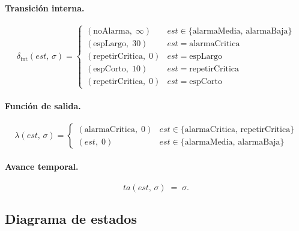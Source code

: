 \documentclass{article}
\newcommand{\dint}{\delta_{\mathrm{int}}}
\newcommand{\ta}{\mathit{ta}}
\begin{document}
\paragraph{Transición interna.}
\[
\dint(\mathit{est},\,\sigma) =
\begin{cases}
  (\mathrm{noAlarma},\;\infty)       & \mathit{est}\in\{\mathrm{alarmaMedia},\,\mathrm{alarmaBaja}\} \\[4pt]
  (\mathrm{espLargo},\;30)           & \mathit{est} = \mathrm{alarmaCritica} \\[4pt]
  (\mathrm{repetirCritica},\;0)      & \mathit{est} = \mathrm{espLargo} \\[4pt]
  (\mathrm{espCorto},\;10)           & \mathit{est} = \mathrm{repetirCritica} \\[4pt]
  (\mathrm{repetirCritica},\;0)      & \mathit{est} = \mathrm{espCorto}
\end{cases}
\]

\paragraph{Función de salida.}
\[
\lambda(\mathit{est},\,\sigma) =
\begin{cases}
  (\mathrm{alarmaCritica},\;0)
    & \mathit{est}\in\{\mathrm{alarmaCritica},\,\mathrm{repetirCritica}\} \\[4pt]
  (\mathit{est},\;0)
    & \mathit{est}\in\{\mathrm{alarmaMedia},\,\mathrm{alarmaBaja}\}
\end{cases}
\]

\paragraph{Avance temporal.}
\[
  \ta(\mathit{est},\,\sigma) \;=\; \sigma.
\]

\subsection{Diagrama de estados}
\end{document}
